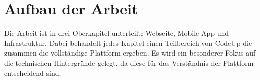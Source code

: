 \documentclass{subfiles}
\begin{document}
\section{Aufbau der Arbeit}
Die Arbeit ist in drei Oberkapitel unterteilt: Webseite, Mobile-App und Infrastruktur.
Dabei behandelt jedes Kapitel einen Teilbereich von CodeUp die zusammen die vollständige Plattform ergeben.
Es wird ein besonderer Fokus auf die technischen Hintergründe gelegt, da diese für das Verständnis der Plattform entscheidend sind.
\end{document}
